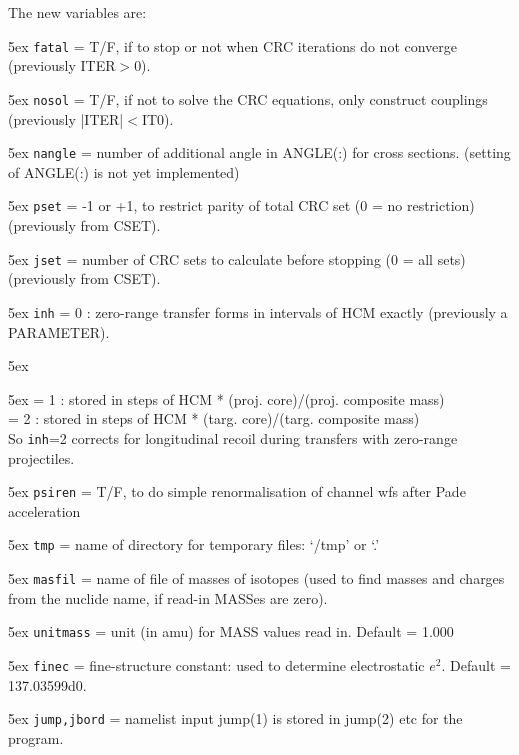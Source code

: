 \documentclass[11pt]{article}
\begin{document}
The new variables are:


\hangindent 5ex
{\tt fatal} = T/F, if to stop or not when CRC iterations do not converge
        (previously ITER$>$0).

\hangindent 5ex
{\tt nosol} = T/F, if not to solve the CRC equations, only construct couplings
        (previously |ITER|$<$IT0).

\hangindent 5ex
{\tt nangle} = number of additional angle in ANGLE(:) for cross sections.
 (setting of ANGLE(:) is not yet implemented)

\hangindent 5ex
{\tt pset} = -1 or +1, to restrict parity of total CRC set (0 = no restriction)
        (previously from CSET).

\hangindent 5ex
{\tt jset} = number of CRC sets to calculate before stopping (0 = all sets)
        (previously from CSET).

\hangindent 5ex
{\tt inh} = 0 : zero-range transfer forms in intervals of HCM exactly
        (previously a PARAMETER).

\hangindent 5ex

\hangindent 5ex
    = 1 : stored in steps of HCM * (proj. core)/(proj. composite mass)\\
    = 2 : stored in steps of HCM * (targ. core)/(targ. composite mass)\\
    So {\tt inh}=2 corrects for longitudinal recoil during transfers
with zero-range projectiles.

\hangindent 5ex
{\tt psiren} = T/F, to do simple renormalisation of channel wfs after Pade acceleration

\hangindent 5ex
{\tt tmp} = name of directory for temporary files: `/tmp' or `.'

\hangindent 5ex
{\tt masfil} = name of file of masses of isotopes (used to find masses and charges
from the nuclide name, if read-in MASSes are zero).

\hangindent 5ex
{\tt unitmass} = unit (in amu) for MASS values read in.
Default = 1.000

\hangindent 5ex
{\tt finec} = fine-structure constant: used to determine electrostatic $e^2$.
Default = 137.03599d0.

\hangindent 5ex
{\tt jump,jbord} = namelist input jump(1) is stored in jump(2) etc for the program.


\end{document}
